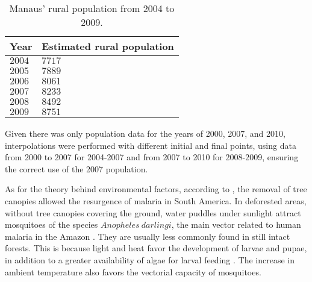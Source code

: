 \documentclass[a4paper,fleqn]{cas-dc}
\begin{document}
\begin{table}[width=.9\linewidth,cols=4,pos=h]
\caption{Manaus' rural population from 2004 to 2009.}\label{tbl1}
\begin{tabular*}{\tblwidth}{@{} LL@{} } %
\toprule
\textbf{Year}  & \textbf{Estimated rural population}\\
\midrule
$2004$ & $7717$ \\
 $2005$ & $7889$ \\
$2006$ & $8061$ \\
$2007$ & $8233$ \\
$2008$ & $8492$ \\
$2009$ & $8751$ \\
\bottomrule
\end{tabular*}
\end{table}


Given there was only population data for the years of 2000, 2007, and 2010, 
interpolations were performed with different initial and final 
points, using data from 2000 to 2007 for 2004-2007 and from 2007 
to 2010 for 2008-2009, ensuring the correct use of the 2007 population.

As for the theory behind environmental factors, 
according to \cite{Norris2004}, the removal of tree canopies allowed 
the resurgence of malaria in South America. In deforested areas, 
without tree canopies covering the ground, water puddles under sunlight 
attract mosquitoes of the species $Anopheles \ darlingi$, the main vector 
related to human malaria in the Amazon \cite{infoAnopheles}. They are 
usually less commonly found in still intact forests. This is 
because light and heat favor the development of larvae and 
pupae, in addition to a greater availability of algae for 
larval feeding \cite{article_alteracoesambientais}. The increase 
in ambient temperature also favors the vectorial capacity of 
mosquitoes. 
\end{document}
